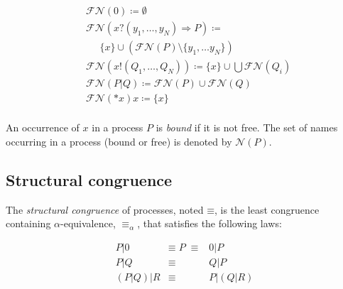 \documentclass[]{acm_proc_article-sp}
\newcommand{\id}[1]{\texttt{#1}}
\newcommand{\pzero}{\mathbin{0}}
\newcommand{\juxtap}{\mathbin{\id{|}}}
\newcommand{\scong}{\mathbin{\equiv}}
\newcommand{\alphaeq}{\mathbin{\equiv_{\alpha}}}
\newcommand{\names}[1]{\mathbin{\mathcal{N}(#1)}}
\newcommand{\freenames}[1]{\mathbin{\mathcal{FN}(#1)}}
\newcommand{\binpar}[2]{#1 \juxtap #2}
\newcommand{\defneqls}{\coloneqq}
\numberwithin{equation}{subsection}
\begin{document}
\begin{equation*}
  \begin{aligned}
    & \freenames{\pzero} \defneqls \emptyset \\
    & \freenames{{x}{?}{( y_1, \ldots, y_N )} \Rightarrow {P}} \defneqls \\
    & \;\;\;\;\;\{ x \} \cup (\freenames{P} \setminus \{ y_1, \ldots y_N \}) \\
    & \freenames{{x}{!}{( Q_1, \ldots, Q_N )}} \defneqls \{ x \} \cup \bigcup \freenames{Q_i} \\
    & \freenames{\binpar{P}{Q}} \defneqls \freenames{P} \cup \freenames{Q} \\
    & \freenames{{*}{x}} x\defneqls \{ x \} \\
  \end{aligned}
\end{equation*}

An occurrence of $x$ in a process $P$ is \textit{bound} if it is not
free. The set of names occurring in a process (bound or free) is
denoted by $\names{P}$.

\subsection{Structural congruence}

The {\em structural congruence} of processes, noted $\scong$, is the
least congruence containing $\alpha$-equivalence, $\alphaeq$, that
satisfies the following laws:

\begin{eqnarray*}
	{P} \juxtap \pzero	
		&  \scong \; {P} \; \scong & 
			\pzero \juxtap {P} \\
	{P} \juxtap {Q}	
		& \scong & 
			{Q} \juxtap {P} \\
	({P} \juxtap {Q}) \juxtap {R}
		& \scong & 
			{P} \juxtap ({Q} \juxtap {R}) \\
\end{eqnarray*}
\end{document}
